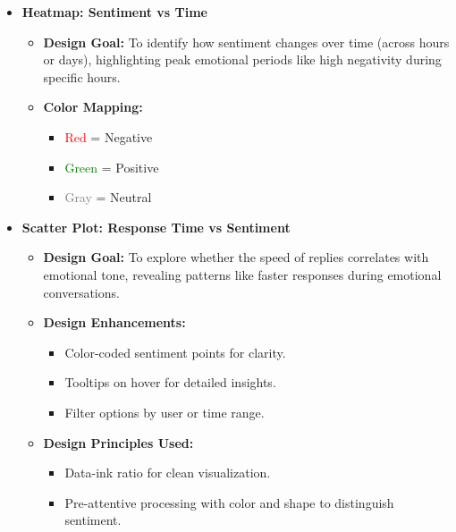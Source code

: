 \documentclass{article}\usepackage{graphicx}
\begin{document}
\begin{itemize}
    \item \textbf{Heatmap: Sentiment vs Time}
    \begin{itemize}
        \item \textbf{Design Goal:} To identify how sentiment changes over time (across hours or days), highlighting peak emotional periods like high negativity during specific hours.
        \item \textbf{Color Mapping:}
        \begin{itemize}
            \item \textcolor{red}{Red} = Negative
            \item \textcolor{green}{Green} = Positive
            \item \textcolor{gray}{Gray} = Neutral
        \end{itemize}
    \end{itemize}
    
    \item \textbf{Scatter Plot: Response Time vs Sentiment}
    \begin{itemize}
        \item \textbf{Design Goal:} To explore whether the speed of replies correlates with emotional tone, revealing patterns like faster responses during emotional conversations.
        \item \textbf{Design Enhancements:}
        \begin{itemize}
            \item Color-coded sentiment points for clarity.
            \item Tooltips on hover for detailed insights.
            \item Filter options by user or time range.
        \end{itemize}
        \item \textbf{Design Principles Used:}
        \begin{itemize}
            \item Data-ink ratio for clean visualization.
            \item Pre-attentive processing with color and shape to distinguish sentiment.
        \end{itemize}
    \end{itemize}
    

\end{itemize}
\end{document}
